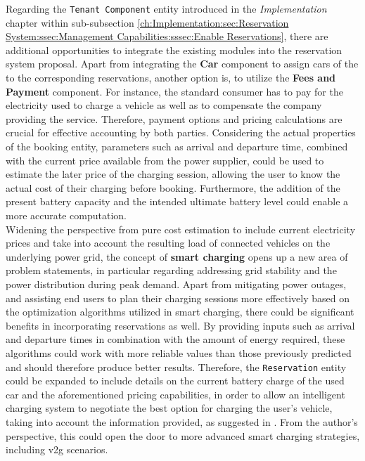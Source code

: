 Regarding the \texttt{Tenant Component} entity introduced in the \textit{Implementation} chapter within sub-subsection \ref{ch:Implementation:sec:Reservation System:ssec:Management Capabilities:sssec:Enable Reservations}, there are additional opportunities to integrate the existing modules into the reservation system proposal. 
Apart from integrating the \textbf{Car} component to assign cars of the  to the corresponding reservations, another option is, to utilize the \textbf{Fees and Payment} component.
For instance, the standard consumer has to pay for the electricity used to charge a vehicle as well as to compensate the company providing the service. Therefore, payment options and pricing calculations are crucial for effective accounting by both parties. 
Considering the actual properties of the booking entity, parameters such as arrival and departure time, combined with the current price available from the power supplier, could be used to estimate the later price of the charging session, allowing the user to know the actual cost of their charging before booking.
Furthermore, the addition of the present battery capacity and the intended ultimate battery level could enable a more accurate computation. \\
Widening the perspective from pure cost estimation to include current electricity prices and take into account the resulting load of connected vehicles on the underlying power grid, the concept of \textbf{smart charging} opens up a new area of problem statements, in particular regarding addressing grid stability and the power distribution during peak demand.
Apart from mitigating power outages, and assisting end users to plan their charging sessions more effectively based on the optimization algorithms utilized in smart charging, there could be significant benefits in incorporating reservations as well.
By providing inputs such as arrival and departure times in combination with the amount of energy required, these algorithms could work with more reliable values than those previously predicted and should therefore produce better results.
Therefore, the \texttt{Reservation} entity could be expanded to include details on the current battery charge of the used car and the aforementioned pricing capabilities, in order to allow an intelligent charging system to negotiate the best option for charging the user's vehicle, taking into account the information provided, as suggested in \cite{orcioni_ev_2020}.
From the author's perspective, this could open the door to more advanced smart charging strategies, including \acrshort{v2g} scenarios. \\

